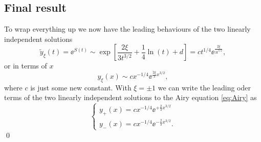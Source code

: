 \documentclass[11pt,letter, swedish, english
]{article}
\begin{document}
\subsection*{Final result}
To wrap everything up we now have the leading behaviours of the two
linearly independent solutions
\begin{equation}
\tilde{y}_\xi(t)=\ee^{S(t)}
\sim\exp[\frac{2\xi}{3t^{3/2}}+\frac{1}{4}\ln(t)+d]
=c t^{1/4} \ee^{\frac{2\xi}{3t^{3/2}}},
\end{equation}
or in terms of $x$
\begin{equation}
y_\xi(x)\sim c x^{-1/4} \ee^{\frac{2\xi}{3}x^{3/2}},
\end{equation}
where $c$ is just some new constant. With $\xi=\pm1$ we can write the
leading oder terms of the two linearly independent solutions to the
Airy equation \eqref{eq:Airy} as
\begin{equation}
\begin{cases}
y_+(x)= c x^{-1/4} \ee^{+\frac{2}{3}x^{3/2}}\\
y_-(x)= c x^{-1/4} \ee^{-\frac{2}{3}x^{3/2}}.
\end{cases}
\end{equation}
\qed
\end{document}
